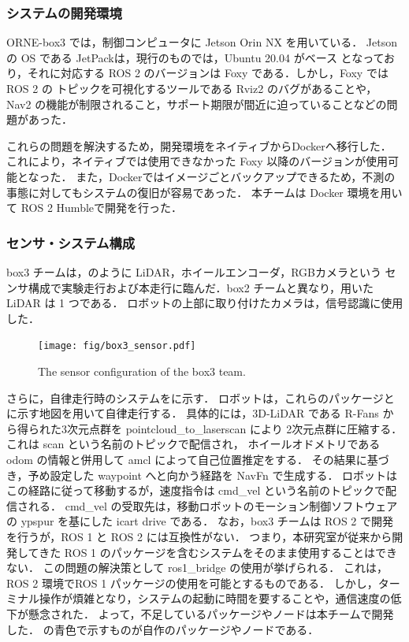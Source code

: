 \documentclass[twocolumn, 9pt]{jsproceedings}
\begin{document}
\subsubsection{システムの開発環境}
ORNE-box3 では，制御コンピュータに Jetson Orin NX を用いている．
Jetson の OS である JetPack\cite{JetPack}は，現行のものでは，Ubuntu 20.04\cite{ubuntu} がベース
となっており，それに対応する ROS 2 のバージョンは Foxy\cite{foxy} である．しかし，Foxy では ROS 2 の
トピックを可視化するツールである Rviz2\cite{rviz2} のバグ\cite{rviz-bag}があることや，
Nav2\cite{nav2} の機能が制限されること，サポート期限が間近に迫っていることなどの問題があった．

これらの問題を解決するため，開発環境をネイティブからDocker\cite{Docker}へ移行した．
これにより，ネイティブでは使用できなかった Foxy 以降のバージョンが使用可能となった．
また，Dockerではイメージごとバックアップできるため，不測の事態に対してもシステムの復旧が容易であった．
本チームは Docker 環境を用いて ROS 2 Humble\cite{humble}で開発を行った．


\subsubsection{センサ・システム構成}
box3 チームは，のように LiDAR，ホイールエンコーダ，RGBカメラという
センサ構成で実験走行および本走行に臨んだ．box2 チームと異なり，用いたLiDAR は 1 つである．
ロボットの上部に取り付けたカメラは，信号認識に使用した．

\begin{figure}[h!]
  \centering
  \texttt{[image: fig/box3\_sensor.pdf]}
  \caption{The sensor configuration of the box3 team.}
  \label{fig:box3-sensor}
\end{figure}


さらに，自律走行時のシステムをに示す．
ロボットは，これらのパッケージとに示す地図を用いて自律走行する．
具体的には，3D-LiDAR である R-Fans から得られた3次元点群を pointcloud\_to\_laserscan により
2次元点群に圧縮する．これは scan という名前のトピックで配信され，
ホイールオドメトリである odom の情報と併用して amcl\cite{amcl} によって自己位置推定をする．
その結果に基づき，予め設定した waypoint へと向かう経路を NavFn\cite{navfn} で生成する．
ロボットはこの経路に従って移動するが，速度指令は cmd\_vel という名前のトピックで配信される．
cmd\_vel の受取先は，移動ロボットのモーション制御ソフトウェアの ypspur\cite{ypspur} を基にした 
icart drive\cite{icart_driver} である．
なお，box3 チームは ROS 2 で開発を行うが，ROS 1 と ROS 2 には互換性がない．
つまり，本研究室が従来から開発してきた ROS 1 のパッケージを含むシステムをそのまま使用することはできない．
この問題の解決策として ros1\_bridge\cite{bridge} の使用が挙げられる．
これは，ROS 2 環境でROS 1 パッケージの使用を可能とするものである．
しかし，ターミナル操作が煩雑となり，システムの起動に時間を要することや，通信速度の低下が懸念された．
よって，不足しているパッケージやノードは本チームで開発した． 
の青色で示すものが自作のパッケージやノードである．
\end{document}
